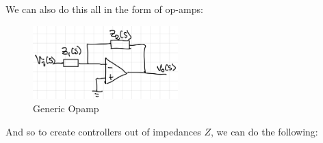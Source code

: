 \documentclass{article}
\begin{document}
We can also do this all in the form of op-amps:

\begin{figure}[H]
  \centering
  \begin{center}
    \includegraphics[width=0.5\textwidth]{images/generic_opamp.png}
  \end{center}
  \caption{Generic Opamp}
  \label{fig:opamp}
\end{figure}

And so to create controllers out of impedances $Z$, we can do the following:
\end{document}

